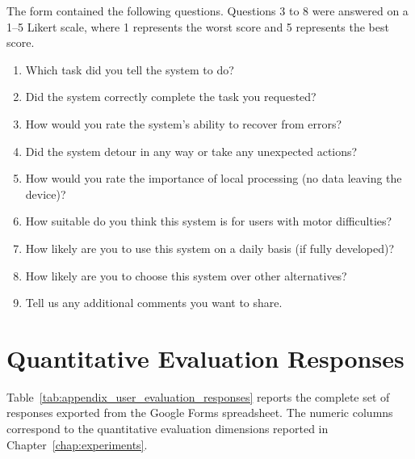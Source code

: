 The form contained the following questions. Questions 3 to 8 were answered on a 1--5 Likert scale, where 1 represents the worst score and 5 represents the best score.

\begin{enumerate}
    \item Which task did you tell the system to do?
    \item Did the system correctly complete the task you requested?
    \item How would you rate the system's ability to recover from errors?
    \item Did the system detour in any way or take any unexpected actions?
    \item How would you rate the importance of local processing (no data leaving the device)?
    \item How suitable do you think this system is for users with motor difficulties?
    \item How likely are you to use this system on a daily basis (if fully developed)?
    \item How likely are you to choose this system over other alternatives?
    \item Tell us any additional comments you want to share.
\end{enumerate}

\section{Quantitative Evaluation Responses}

Table~\ref{tab:appendix_user_evaluation_responses} reports the complete set of responses exported from the Google Forms spreadsheet. The numeric columns correspond to the quantitative evaluation dimensions reported in Chapter~\ref{chap:experiments}.

